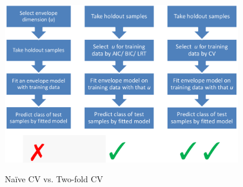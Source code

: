 \documentclass[11pt]{llncs}
\begin{document}
\begin{figure}[t]
\begin{center}
   \includegraphics[height=7cm]{cv.png}
   \label{fig:fig1}
   \caption{Na\"{i}ve CV vs. Two-fold CV}
\end{center}
\end{figure}
\end{document}
